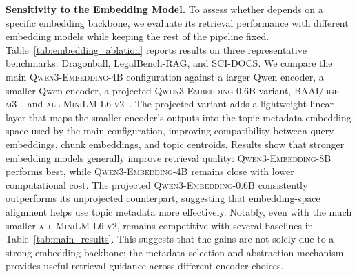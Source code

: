 \noindent
\textbf{Sensitivity to the Embedding Model. }
To assess whether \name{} depends on a specific embedding backbone, we evaluate its retrieval performance with different embedding models while keeping the rest of the pipeline fixed. Table~\ref{tab:embedding_ablation} reports results on three representative benchmarks: Dragonball, LegalBench-RAG, and SCI-DOCS. We compare the main \textsc{Qwen3-Embedding-4B} configuration against a larger Qwen encoder, a smaller Qwen encoder, a projected \textsc{Qwen3-Embedding-0.6B} variant, \textsc{BAAI/bge-m3}~\cite{chen-etal-2024-m3}, and \textsc{all-MiniLM-L6-v2}~\cite{reimers2019sentencebertsentenceembeddingsusing, wang2020minilmdeepselfattentiondistillation}. The projected variant adds a lightweight linear layer that maps the smaller encoder's outputs into the topic-metadata embedding space used by the main configuration, improving compatibility between query embeddings, chunk embeddings, and topic centroids. Results show that stronger embedding models generally improve retrieval quality: \textsc{Qwen3-Embedding-8B} performs best, while \textsc{Qwen3-Embedding-4B} remains close with lower computational cost. The projected \textsc{Qwen3-Embedding-0.6B} consistently outperforms its unprojected counterpart, suggesting that embedding-space alignment helps \name{} use topic metadata more effectively. Notably, even with the much smaller \textsc{all-MiniLM-L6-v2}, \name{} remains competitive with several baselines in Table~\ref{tab:main_results}. This suggests that the gains are not solely due to a strong embedding backbone; the metadata selection and abstraction mechanism provides useful retrieval guidance across different encoder choices.

